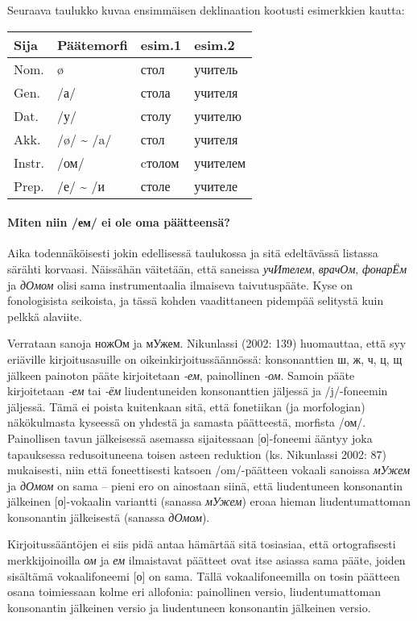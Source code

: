 \documentclass[]{scrartcl}
\begin{document}
Seuraava taulukko kuvaa ensimmäisen deklinaation kootusti esimerkkien
kautta:

\begin{longtable}[c]{@{}llll@{}}
\toprule
Sija & Päätemorfi & esim.1 & esim.2\tabularnewline
\midrule
\endhead
Nom. & ø & стол & учитель\tabularnewline
Gen. & /а/ & стола & учителя\tabularnewline
Dat. & /у/ & столу & учителю\tabularnewline
Akk. & /ø/ \textasciitilde{} /a/ & стол & учителя\tabularnewline
Instr. & /ом/ & cтолом & учителем\tabularnewline
Prep. & /е/ \textasciitilde{} /и & столе & учителе\tabularnewline
\bottomrule
\end{longtable}

\paragraph{Miten niin /ем/ ei ole oma
päätteensä?}\label{miten-niin-ux435ux43c-ei-ole-oma-puxe4uxe4tteensuxe4}

Aika todennäköisesti jokin edellisessä taulukossa ja sitä edeltävässä
listassa särähti korvaasi. Näissähän väitetään, että saneissa
\emph{учИтелем}, \emph{врачОм}, \emph{фонарЁм} ja \emph{дОмом} olisi
sama instrumentaalia ilmaiseva taivutuspääte. Kyse on fonologisista
seikoista, ja tässä kohden vaadittaneen pidempää selitystä kuin pelkkä
alaviite.

Verrataan sanoja ножОм ja мУжем. Nikunlassi (2002: 139) huomauttaa, että
syy eriäville kirjoitusasuille on oikeinkirjoitussäännössä:
konsonanttien ш, ж, ч, ц, щ jälkeen painoton pääte kirjoitetaan
\emph{-ем}, painollinen \emph{-ом}. Samoin pääte kirjoitetaan \emph{-ем}
tai \emph{-ём} liudentuneiden konsonanttien jäljessä ja /j/-foneemin
jäljessä. Tämä ei poista kuitenkaan sitä, että fonetiikan (ja
morfologian) näkökulmasta kyseessä on yhdestä ja samasta päätteestä,
morfista /ом/. Painollisen tavun jälkeisessä asemassa sijaitessaan
{[}о{]}-foneemi ääntyy joka tapauksessa redusoituneena toisen asteen
reduktion (ks. Nikunlassi 2002: 87) mukaisesti, niin että foneettisesti
katsoen /om/-päätteen vokaali sanoissa \emph{мУжем} ja \emph{дОмом} on
sama -- pieni ero on ainostaan siinä, että liudentuneen konsonantin
jälkeinen {[}о{]}-vokaalin variantti (sanassa \emph{мУжем}) eroaa hieman
liudentumattoman konsonantin jälkeisestä (sanassa \emph{дОмом}).

Kirjoitussääntöjen ei siis pidä antaa hämärtää sitä tosiasiaa, että
ortografisesti merkkijoinoilla \emph{ом} ja \emph{ем} ilmaistavat
päätteet ovat itse asiassa sama pääte, joiden sisältämä vokaalifoneemi
{[}о{]} on sama. Tällä vokaalifoneemilla on tosin päätteen osana
toimiessaan kolme eri allofonia: painollinen versio, liudentumattoman
konsonantin jälkeinen versio ja liudentuneen konsonantin jälkeinen
versio.
\end{document}
